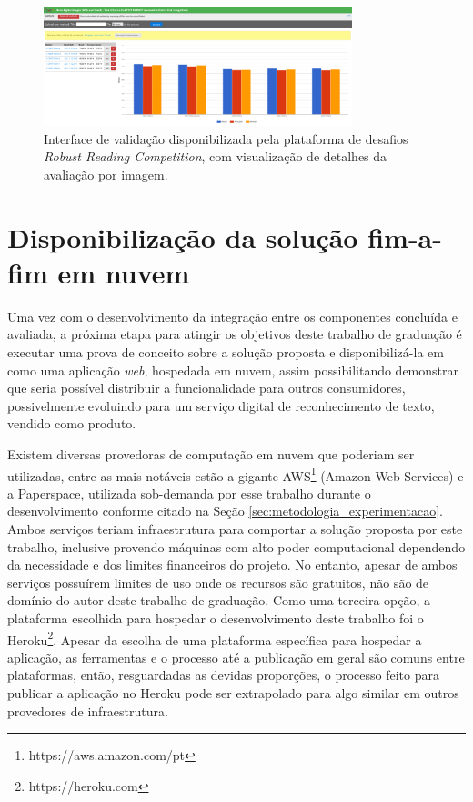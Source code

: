 \begin{figure}
    \centering
    \includegraphics[width=0.8\textwidth]{figs/metodologia-interface-validacao.png}
    \caption{Interface de validação disponibilizada pela plataforma de desafios \textit{Robust Reading Competition}, com visualização de detalhes 
    da avaliação por imagem.}
    \label{fig:methodology_validation_interface_details}
\end{figure}

\section{Disponibilização da solução fim-a-fim em nuvem}\label{sec:methodology_cloud_deploy}
Uma vez com o desenvolvimento da integração entre os componentes concluída e avaliada, a próxima etapa para atingir os objetivos deste trabalho 
de graduação é executar uma prova de conceito sobre a solução proposta e disponibilizá-la em como uma aplicação \textit{web}, hospedada em nuvem, 
assim possibilitando demonstrar que seria possível distribuir a funcionalidade para outros consumidores, possivelmente evoluindo para um serviço 
digital de reconhecimento de texto, vendido como produto.

Existem diversas provedoras de computação em nuvem que poderiam ser utilizadas, entre as mais notáveis estão a gigante AWS\footnote{https://aws.amazon.com/pt} 
(Amazon Web Services) e a Paperspace, utilizada sob-demanda por esse trabalho durante o desenvolvimento conforme citado na Seção 
\ref{sec:metodologia_experimentacao}. Ambos serviços teriam infraestrutura para comportar a solução proposta por este trabalho, inclusive provendo 
máquinas com alto poder computacional dependendo da necessidade e dos limites financeiros do projeto. No entanto, apesar de ambos serviços possuírem 
limites de uso onde os recursos são gratuitos, não são de domínio do autor deste trabalho de graduação. Como uma terceira opção, a plataforma 
escolhida para hospedar o desenvolvimento deste trabalho foi o Heroku\footnote{https://heroku.com}. Apesar da escolha de uma plataforma específica 
para hospedar a aplicação, as ferramentas e o processo até a publicação em geral são comuns entre plataformas, então, resguardadas as devidas proporções, 
o processo feito para publicar a aplicação no Heroku pode ser extrapolado para algo similar em outros provedores de infraestrutura.

